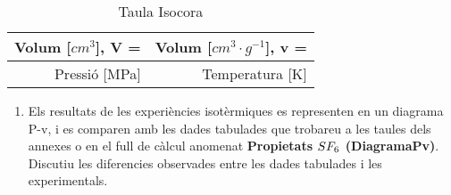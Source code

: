 \documentclass[a4paper]{article}
\begin{document}
\begin{table}[H]
	\centering
	\begin{tabular}{rr}
		\textbf{Volum [$cm^3$], V = } & \textbf{Volum [$cm^3 · g^{-1}$], v = } \\
		\hline
		Pressió [MPa] & Temperatura [K] \\
	\end{tabular}
	\caption{Taula Isocora}
\end{table}

\begin{enumerate}[resume]
	\item Els resultats de les experiències isotèrmiques es representen en un diagrama P-v, i es comparen amb les dades tabulades que trobareu a les taules dels annexes o en el full de càlcul anomenat \textbf{Propietats $\boldmath SF_6$ (DiagramaPv)}. Discutiu les diferencies observades entre les dades tabulades i les experimentals.
\end{enumerate}

\begin{figure}[H]
	\begin{tikzpicture}
		
	\end{tikzpicture}
\end{figure}
\end{document}
